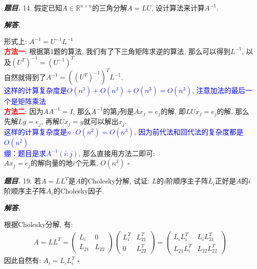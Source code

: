 \documentclass[10pt, a4paper, oneside]{ctexart}
\newenvironment{problem}{\begin{framed}\par\noindent\textbf{\textit{题目. }}}{\end{framed}\par}
\newenvironment{solution}{%
  \par\noindent\textbf{\textit{解答. }}\ignorespaces
}{%
  \hfill\ensuremath{\square}\par %
}
\begin{document}
\begin{problem}
14. 假定已知$A\in \mathbb{R}^{n\times n}$的三角分解$A=LU$, 设计算法来计算$A^{-1}$.
\end{problem}
\begin{solution}
形式上: $A^{-1} = U^{-1} L^{-1}$\\
\textcolor{red}{\textbf{方法一}}: 根据第1题的算法, 我们有了下三角矩阵求逆的算法, 那么可以得到$L^{-1}$, 以及$(U^{T})^{-1}=(U^{-1})^T$\\自然就得到了$A^{-1} = ((U^{T})^{-1})^T L^{-1}$.\\\textcolor{blue}{这样的计算复杂度是$O(n^3)+O(n^3)+O(n^3)=O(n^3)$, 注意加法的最后一个是矩阵乘法}\\
\textcolor{red}{\textbf{方法二}}: 因为$AA^{-1}=I$, 那么$A^{-1}$的第$j$列是$Ax_j=e_j$的解, 即$LUx_j=e_j$的解, 那么先解$Ly=e_j$, 再解$Ux_j=y$就可以解出$x_j$.\\
\textcolor{blue}{这样的计算复杂度是$n\cdot O(n^2) = O(n^3)$, 因为前代法和回代法的复杂度都是$O(n^2)$}\\
\textcolor{blue}{绷：题目是求$A^{-1}(i:j)$}, 那么直接用方法二即可:\\
$Ax_j=e_j$的解向量的地$i$个元素, $O(n^2)$
\end{solution}

\begin{problem}
19. 若$A=LL^T$是$A$的Cholesky分解, 试证: $L$的$i$阶顺序主子阵$L_i$正好是$A$的$i$阶顺序主子阵$A_i$的Cholesky因子.
\end{problem}

\begin{solution}
根据Cholesky分解, 有:
\begin{align*}
    A = LL^T = \begin{pmatrix}
        L_i & 0\\ L_{21} & L_{22}
    \end{pmatrix} \begin{pmatrix}
        L_i^T & L_{21}^T\\ 0 & L_{22}^T
    \end{pmatrix}=\begin{pmatrix}
        L_iL_i^T & L_i L_{21}^T \\ L_{21}L_i^T & L_{22}L_{22}^T
    \end{pmatrix}
\end{align*}
因此自然有: $A_i = L_i L_i^T$
\end{solution}
\end{document}
